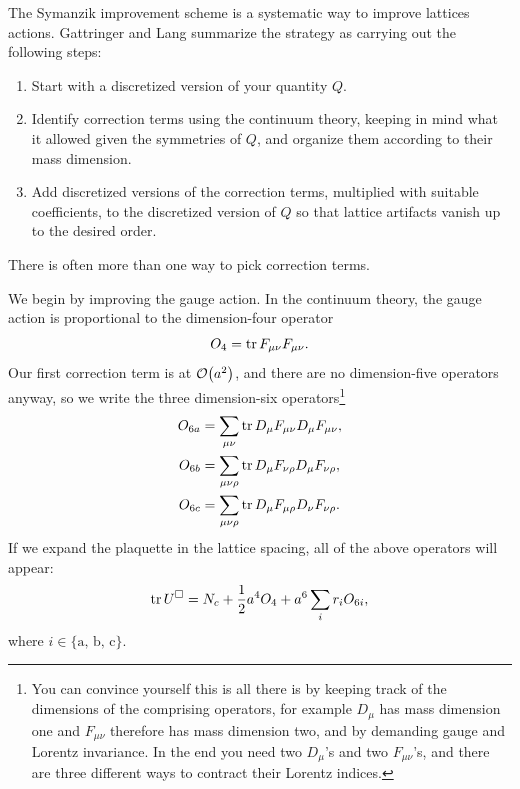 The Symanzik improvement scheme \cite{symanzik_continuum_1983,
symanzik_continuum_1983-1,curci_symanziks_1983,luscher_shell_1985} 
is a systematic way to
improve lattices actions. Gattringer and Lang summarize the strategy as
carrying out the following steps:
\begin{enumerate}
  \item Start with a discretized version of your quantity $Q$.
  \item Identify correction terms using the continuum theory, keeping in mind
        what it allowed given the symmetries of $Q$, and organize them according
        to their mass dimension.
  \item Add discretized versions of the correction terms, multiplied with
        suitable coefficients, to the discretized version of $Q$ so that 
        lattice artifacts vanish up to the desired order.
\end{enumerate}
There is often more than one way to pick correction terms.

We begin by improving the gauge action. In the continuum theory, the gauge
action is proportional to the dimension-four operator
\begin{equation}
  O_4 = \tr F_{\mu\nu}F_{\mu\nu}.
\end{equation}
Our first correction term is at $\order{a^2}$, and there are no dimension-five
operators anyway, so we write the three dimension-six operators\footnote{You 
can convince yourself this is all there is by keeping track of the
dimensions of the comprising operators, for example $D_\mu$ has mass dimension
one and $F_{\mu\nu}$ therefore has mass dimension two, and by demanding gauge
and Lorentz invariance. In the end you need two $D_\mu$'s and two 
$F_{\mu\nu}$'s, and there are three different ways to contract their 
Lorentz indices.}
\begin{equation}\begin{aligned}
  O_{6a}&=\sum_{\mu\nu}\tr D_\mu F_{\mu\nu} D_\mu F_{\mu\nu},\\
  O_{6b}&=\sum_{\mu\nu\rho}\tr D_\mu F_{\nu\rho} D_\mu F_{\nu\rho},\\
  O_{6c}&=\sum_{\mu\nu\rho}\tr D_\mu F_{\mu\rho} D_\nu F_{\nu\rho}.
\end{aligned}\end{equation}
If we expand the plaquette in the lattice spacing, all of the above
operators will appear:
\begin{equation}
  \tr U^\square = N_c + \frac{1}{2}a^4O_4+a^6\sum_i r_iO_{6i},
\end{equation}
where $i\in\{\text{a, b, c}\}$.

